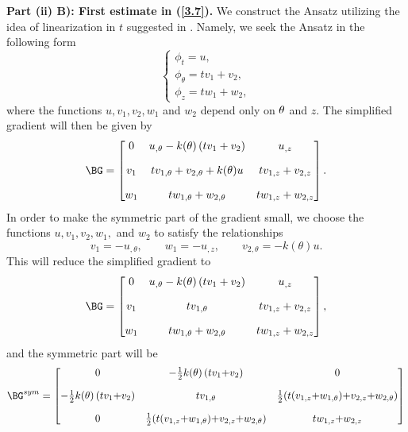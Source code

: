 \noindent \textbf{Part (ii) B): First estimate in (\ref{3.7}).} We construct the Ansatz utilizing the idea of linearization in $t$ suggested in \cite{bib:Gra.Har.1}. Namely, we seek the Ansatz in the following form 
\begin{equation}
\label{4.47}
\begin{cases}
\phi_t=u,\\
\phi_\theta=tv_1+v_2,\\
\phi_z=tw_1+w_2,
\end{cases}
\end{equation}
where the functions $u,v_1,v_2,w_1$ and $w_2$ depend only on $\theta$ and $z.$ The simplified gradient will then be given by 
\begin{equation*}
\BG=
\begin{bmatrix} 
0       &       u_{,\Gth}-k(\theta)\left(tv_1+v_2\right)     &      u_{,z} \\[10pt]
v_1    &        tv_{1,\theta}+v_{2,\Gth}+k(\Gth)u           &        tv_{1,z}+v_{2,z}\\[10pt]
w_1    &      tw_{1,\theta}+w_{2,\theta}                        &          tw_{1,z}+w_{2,z}
\end{bmatrix}.
\end{equation*}
In order to make the symmetric part of the gradient small, we choose the functions $u,v_1,v_2,w_1,$ and $w_2$ to satisfy the relationships
\begin{equation}
\label{4.48}
v_1=-u_{,\theta},\qquad w_1=-u_{,z},\qquad v_{2,\theta}=-k(\theta)u.
\end{equation}
This will reduce the simplified gradient to 
\begin{equation}
\label{4.49}
\BG=
\begin{bmatrix} 
0       &       u_{,\Gth}-k(\theta)\left(tv_1+v_2\right)     &      u_{,z} \\[10pt]
v_1    &        tv_{1,\theta}         &        tv_{1,z}+v_{2,z}\\[10pt]
w_1    &      tw_{1,\theta}+w_{2,\theta}                        &          tw_{1,z}+w_{2,z}
\end{bmatrix},
\end{equation}
and the symmetric part will be
\begin{equation}
\label{4.50}
\BG^{sym}=
\begin{bmatrix} 
0       &      -\frac{1}{2}k(\theta)\left(tv_1{+}v_2\right)    &    0 \\[10pt]
-\frac{1}{2}k(\theta)\left(tv_1{+}v_2\right)    &     tv_{1,\theta}    &      \frac{1}{2}( t(v_{1,z}{+}w_{1,\theta}){+}v_{2,z}{+}w_{2,\theta})\\[10pt]
0      &    \frac{1}{2}( t(v_{1,z}{+}w_{1,\theta}){+}v_{2,z}{{+}}w_{2,\theta})    &      tw_{1,z}{+}w_{2,z}
\end{bmatrix} 
\end{equation}
